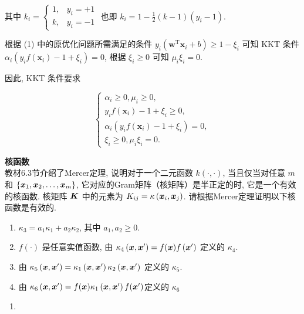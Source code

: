 \documentclass[answers]{exam}  %
\begin{document}
\begin{questions}
\begin{solution}
\begin{enumerate}
            其中 $\displaystyle k_i = \begin{cases} 1, & y_i = +1 \\ k, & y_i = -1 \end{cases}$ 也即 $\displaystyle k_i = 1 - \frac{1}{2}(k - 1)(y_i - 1)$.

            根据 (1) 中的原优化问题所需满足的条件 $y_i(\bm{w}^{\mathrm{T}}\bm{x}_i + b) \ge 1 - \xi_i$ 可知 KKT 条件 $\alpha_i(y_i f(\bm{x}_i) - 1 + \xi_i) = 0$, 根据 $\xi_i \ge 0$ 可知 $\mu_i \xi_i = 0$.

            因此, KKT 条件要求

            $$
              \begin{cases}
                \alpha_i \ge 0, \mu_i \ge 0,               \\
                y_i f(\bm{x}_i) - 1 + \xi_i \ge 0,         \\
                \alpha_i(y_i f(\bm{x}_i) - 1 + \xi_i) = 0, \\
                \xi_i \ge 0, \mu_i \xi_i = 0.
              \end{cases}
            $$
    \end{enumerate}
  \end{solution}
  \question [20] \textbf{核函数} \\
  教材6.3节介绍了Mercer定理, 说明对于一个二元函数 $k(\cdot, \cdot)$, 当且仅当对任意 $m$ 和 $\{{\boldsymbol{x}}_{1}, {\boldsymbol{x}}_{2}, \ldots, {\boldsymbol{x}}_{m}\}$, 它对应的Gram矩阵（核矩阵）是半正定的时, 它是一个有效的核函数. 核矩阵 $\boldsymbol{K}$ 中的元素为 $K_{i j}=\kappa\left({\boldsymbol{x}}_{i}, {\boldsymbol{x}}_{j}\right)$. 请根据Mercer定理证明以下核函数是有效的.

  \begin{enumerate}
    \item $\kappa_{3}=a_{1} \kappa_{1}+a_{2} \kappa_{2}$, 其中 $a_{1}, a_{2} \geq 0$.
    \item $f(\cdot)$ 是任意实值函数, 由 $\kappa_{4}\left({\boldsymbol{x}}, {\boldsymbol{x}}^{\prime}\right)=f({\boldsymbol{x}}) f\left({\boldsymbol{x}}^{\prime}\right)$ 定义的 $\kappa_{4}$.
    \item 由 $\kappa_{5}\left({\boldsymbol{x}}, {\boldsymbol{x}}^{\prime}\right)=\kappa_{1}\left({\boldsymbol{x}}, {\boldsymbol{x}}^{\prime}\right) \kappa_{2}\left({\boldsymbol{x}}, {\boldsymbol{x}}^{\prime}\right)$ 定义的 $\kappa_{5}$.
    \item 由 $\kappa_{6}\left({\boldsymbol{x}}, {\boldsymbol{x}}^{\prime}\right)=f({\boldsymbol{x}}) \kappa_{1}\left({\boldsymbol{x}}, {\boldsymbol{x}}^{\prime}\right)f({\boldsymbol{x}}')$定义的 $\kappa_{6}$
  \end{enumerate}
  \begin{solution}
    \begin{enumerate}
      \item


\end{enumerate}
\end{solution}
\end{questions}
\end{document}
